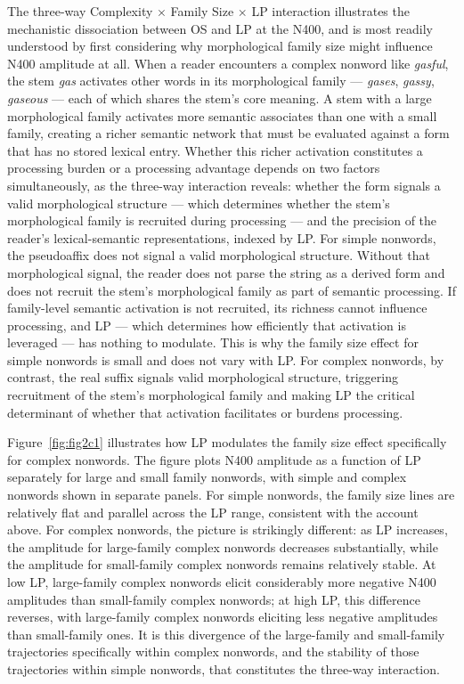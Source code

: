 \documentclass[utf8]{FrontiersinHarvard} %
\begin{document}
	The three-way Complexity $\times$ Family Size $\times$ LP interaction illustrates the mechanistic dissociation between OS and LP at the N400, and is most readily understood by first considering why morphological family size might influence N400 amplitude at all. When a reader encounters a complex nonword like \textit{gasful}, the stem \textit{gas} activates other words in its morphological family --- \textit{gases}, \textit{gassy}, \textit{gaseous} --- each of which shares the stem's core meaning. A stem with a large morphological family activates more semantic associates than one with a small family, creating a richer semantic network that must be evaluated against a form that has no stored lexical entry. Whether this richer activation constitutes a processing burden or a processing advantage depends on two factors simultaneously, as the three-way interaction reveals: whether the form signals a valid morphological structure --- which determines whether the stem's morphological family is recruited during processing --- and the precision of the reader's lexical-semantic representations, indexed by LP. For simple nonwords, the pseudoaffix does not signal a valid morphological structure. Without that morphological signal, the reader does not parse the string as a derived form and does not recruit the stem's morphological family as part of semantic processing. If family-level semantic activation is not recruited, its richness cannot influence processing, and LP --- which determines how efficiently that activation is leveraged --- has nothing to modulate. This is why the family size effect for simple nonwords is small and does not vary with LP. For complex nonwords, by contrast, the real suffix signals valid morphological structure, triggering recruitment of the stem's morphological family and making LP the critical determinant of whether that activation facilitates or burdens processing.
	
	Figure~\ref{fig:fig2c1} illustrates how LP modulates the family size effect specifically for complex nonwords. The figure plots N400 amplitude as a function of LP separately for large and small family nonwords, with simple and complex nonwords shown in separate panels. For simple nonwords, the family size lines are relatively flat and parallel across the LP range, consistent with the account above. For complex nonwords, the picture is strikingly different: as LP increases, the amplitude for large-family complex nonwords decreases substantially, while the amplitude for small-family complex nonwords remains relatively stable. At low LP, large-family complex nonwords elicit considerably more negative N400 amplitudes than small-family complex nonwords; at high LP, this difference reverses, with large-family complex nonwords eliciting less negative amplitudes than small-family ones. It is this divergence of the large-family and small-family trajectories specifically within complex nonwords, and the stability of those trajectories within simple nonwords, that constitutes the three-way interaction.
	
\end{document}
